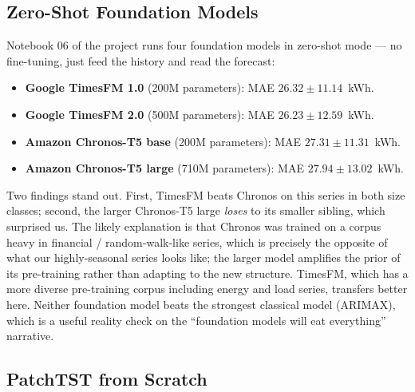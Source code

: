 \subsection{Zero-Shot Foundation Models}

Notebook 06 of the project runs four foundation models in zero-shot
mode --- no fine-tuning, just feed the history and read the
forecast:
\begin{itemize}[leftmargin=*]
    \item \textbf{Google TimesFM 1.0} (200M parameters):
    MAE $26.32 \pm 11.14$~kWh.
    \item \textbf{Google TimesFM 2.0} (500M parameters):
    MAE $26.23 \pm 12.59$~kWh.
    \item \textbf{Amazon Chronos-T5 base} (200M parameters):
    MAE $27.31 \pm 11.31$~kWh.
    \item \textbf{Amazon Chronos-T5 large} (710M parameters):
    MAE $27.94 \pm 13.02$~kWh.
\end{itemize}
Two findings stand out. First, TimesFM beats Chronos on this series
in both size classes; second, the larger Chronos-T5 large
\emph{loses} to its smaller sibling, which surprised us. The likely
explanation is that Chronos was trained on a corpus heavy in
financial / random-walk-like series, which is precisely the opposite
of what our highly-seasonal series looks like; the larger model
amplifies the prior of its pre-training rather than adapting to the
new structure. TimesFM, which has a more diverse pre-training corpus
including energy and load series, transfers better here. Neither
foundation model beats the strongest classical model (ARIMAX), which
is a useful reality check on the ``foundation models will eat
everything'' narrative.

\subsection{PatchTST from Scratch}


